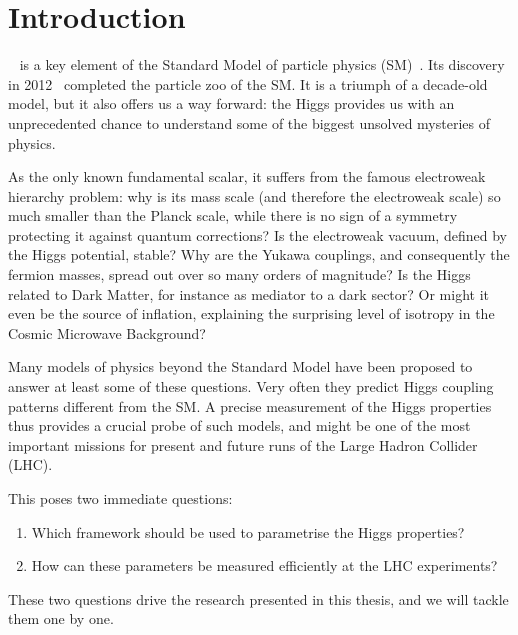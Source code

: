 

\chapter{Introduction}
\label{chapter:Introduction}

~\cite{Higgs:1964ia, Higgs:1964pj,
  Englert:1964et} is a key element of the Standard Model of particle
physics (SM)~\cite{Glashow:1961tr, Weinberg:1967tq, Salam:1968rm}. Its
discovery in 2012~\cite{Aad:2012tfa, Chatrchyan:2012xdj} completed the
particle zoo of the SM. It is a triumph of a decade-old model, but it
also offers us a way forward: the Higgs provides us with an
unprecedented chance to understand some of the biggest unsolved
mysteries of physics.

As the only known fundamental scalar, it suffers from the famous
electroweak hierarchy problem: why is its mass scale (and therefore
the electroweak scale) so much smaller than the Planck scale, while
there is no sign of a symmetry protecting it against quantum
corrections? Is the electroweak vacuum, defined by the Higgs
potential, stable?  Why are the Yukawa couplings, and consequently the
fermion masses, spread out over so many orders of magnitude?  Is the
Higgs related to Dark Matter, for instance as mediator to a dark
sector? Or might it even be the source of inflation, explaining the
surprising level of isotropy in the Cosmic Microwave Background?

Many models of physics beyond the Standard Model have been proposed to
answer at least some of these questions. Very often they predict Higgs
coupling patterns different from the SM. A precise measurement of the
Higgs properties thus provides a crucial probe of such models, and
might be one of the most important missions for present and future
runs of the Large Hadron Collider (LHC).

This poses two immediate questions:
%
\begin{enumerate}
\item Which framework should be used to parametrise the Higgs
  properties?
\item How can these parameters be measured efficiently at the LHC
  experiments?
\end{enumerate}
%
These two questions drive the research presented in this thesis, and
we will tackle them one by one.

